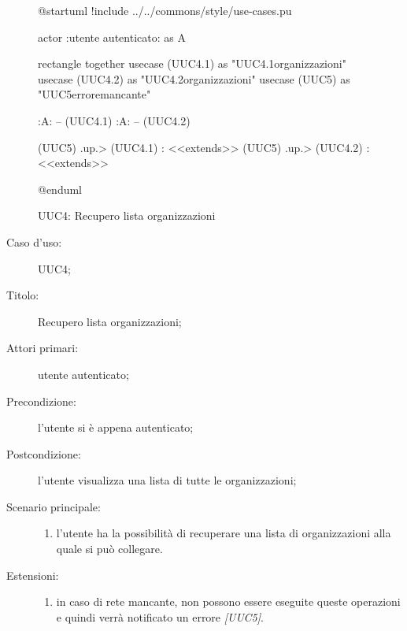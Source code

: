\documentclass[../../../analisi-dei-requisiti.tex]{subfiles}
\begin{document}
\begin{figure}[H]
  \centering
  \begin{plantuml}
  @startuml
  !include ../../commons/style/use-cases.pu

  actor :utente autenticato: as A

  rectangle {
    together {
      usecase (UUC4.1) as "UUC4.1\nAggiornamento\nlista organizzazioni"
      usecase (UUC4.2) as "UUC4.2\nSeleziona organizzazioni"
      usecase (UUC5) as "UUC5\nVisualizzazione errore\nrete mancante"
    }
  }

  :A: -- (UUC4.1)
  :A: -- (UUC4.2)

  (UUC5) .up.> (UUC4.1) : <<extends>>
  (UUC5) .up.> (UUC4.2) : <<extends>>

  @enduml
  \end{plantuml}
  \caption{UUC4: Recupero lista organizzazioni}%
  \label{fig:uuc4}
\end{figure}

\begin{description}
  \item[Caso d’uso:] UUC4;
  \item[Titolo:] Recupero lista organizzazioni;
  \item[Attori primari:] utente autenticato;
  \item[Precondizione:] l'utente si è appena autenticato;
  \item[Postcondizione:] l'utente visualizza una lista di tutte le organizzazioni;
  \item[Scenario principale:]
        \begin{enumerate}
          \item l'utente ha la possibilità di recuperare una lista di organizzazioni alla quale si può collegare.
        \end{enumerate}
  \item[Estensioni:]
        \begin{enumerate}
          \item in caso di rete mancante, non possono essere eseguite queste operazioni e quindi verrà notificato un errore \emph{[UUC5]}.
        \end{enumerate}
\end{description}
\end{document}
